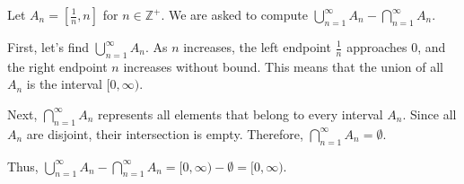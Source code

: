 \documentclass{article}
\begin{document}
Let $A_n=[\frac{1}{n},n]$ for $n\in\mathbb{Z}^+$. We are asked to compute $\bigcup_{n=1}^{\infty}A_n-\bigcap_{n=1}^{\infty}A_n$.

First, let's find $\bigcup_{n=1}^{\infty}A_n$. As $n$ increases, the left endpoint $\frac{1}{n}$ approaches $0$,
and the right endpoint $n$ increases without bound. This means that the union of all $A_n$ is the interval $[0,\infty)$.


Next, $\bigcap_{n=1}^{\infty}A_n$ represents all elements that belong to every interval $A_n$.
Since all $A_n$ are disjoint, their intersection is empty. Therefore, $\bigcap_{n=1}^{\infty}A_n=\emptyset$.

Thus, $\bigcup_{n=1}^{\infty}A_n-\bigcap_{n=1}^{\infty}A_n=[0,\infty)-\emptyset=[0,\infty)$.
\end{document}

